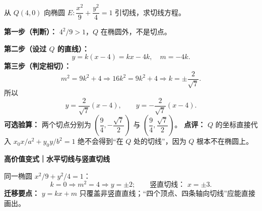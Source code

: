 \begin{examplebox}
从 $Q(4,0)$ 向椭圆 $E:\dfrac{x^2}{9}+\dfrac{y^2}{4}=1$ 引切线，求切线方程。

\textbf{第一步（判断）：} $4^2/9>1$，$Q$ 在椭圆外，不是切点。

\textbf{第二步（设过 $Q$ 的直线）：}
\[
 y=k(x-4)=kx-4k,
 \quad m=-4k.
\]
\textbf{第三步（判定相切）：}
\[
 m^2=9k^2+4
 \Longrightarrow16k^2=9k^2+4
 \Longrightarrow k=\pm\frac2{\sqrt7}.
\]
所以
\[
 \boxed{y=\frac2{\sqrt7}(x-4)},\qquad
 \boxed{y=-\frac2{\sqrt7}(x-4)}.
\]
\textbf{可选验算：} 两个切点分别为
$\left(\dfrac94,-\dfrac{\sqrt7}{2}\right)$ 与
$\left(\dfrac94,\dfrac{\sqrt7}{2}\right)$。
\textbf{点评：} $Q$ 的坐标直接代入 $x_0x/a^2+y_0y/b^2=1$ 绝不会得到“在 $Q$ 处的切线”，因为 $Q$ 根本不在椭圆上。

\medskip
\textbf{\textcolor{CExample}{高价值变式｜水平切线与竖直切线}}

同一椭圆 $x^2/9+y^2/4=1$：
\[
 k=0\Longrightarrow m^2=4\Longrightarrow y=\pm2;
 \qquad\text{竖直切线： }x=\pm3.
\]
\textbf{迁移要点：} $y=kx+m$ 只覆盖非竖直直线；“四个顶点、四条轴向切线”应能直接画出。
\end{examplebox}
